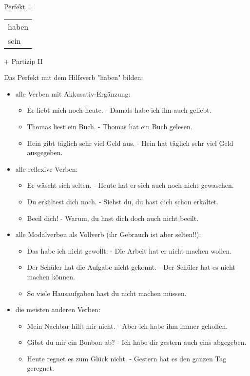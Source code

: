 
Perfekt = \begin{tabular}{l}
haben \\
sein
\end{tabular} + Partizip II

Das Perfekt mit dem Hilfsverb "haben" bilden:
\begin{itemize}
\item alle Verben mit Akkusativ-Erg\"anzung:
\begin{itemize}
	\item Er liebt mich noch heute. - Damals habe ich ihn auch geliebt.
	\item Thomas liest ein Buch. - Thomas hat ein Buch gelesen.
	\item Hein gibt t\"aglich sehr viel Geld aus. - Hein hat t\"aglich sehr viel Geld ausgegeben.
\end{itemize}
\item alle reflexive Verben:
\begin{itemize}
	\item Er w\"ascht sich selten. - Heute hat er sich auch noch nicht gewaschen.
	\item Du erk\"altest dich noch. - Siehst du, du hast dich schon erk\"altet.
	\item Beeil dich! - Warum, du hast dich doch auch nicht beeilt.
\end{itemize}
\item alle Modalverben als Vollverb (ihr Gebrauch ist aber selten!!):
\begin{itemize}
	\item Das habe ich nicht gewollt. - Die Arbeit hat er nicht machen wollen.
	\item Der Sch\"uler hat die Aufgabe nicht gekonnt. - Der Sch\"uler hat es nicht machen können.
	\item So viele Hausaufgaben hast du nicht machen m\"ussen.
\end{itemize}
\item die meisten anderen Verben:
\begin{itemize}
	\item Mein Nachbar hilft mir nicht. - Aber ich habe ihm immer geholfen.
	\item Gibst du mir ein Bonbon ab? - Ich habe dir gestern auch eins abgegeben.
	\item Heute regnet es zum Gl\"uck nicht. - Gestern hat es den ganzen Tag geregnet.
\end{itemize}
\end{itemize}


